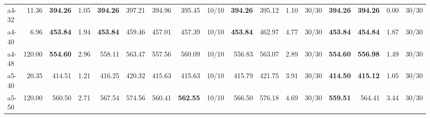 \documentclass[aspectratio=1610]{beamer}
\begin{document}
\begin{frame}[noframenumbering]
\begin{table}[]
{\begin{tabular}{lrrrrrrrrrrrrrrrr}
a4-32                                          & 11.36                                                   & \multicolumn{1}{r|}{\textbf{394.26}} & 1.05                                                         & \textbf{394.26} & \multicolumn{1}{r|}{397.21}                                 & 394.96          & 395.45                                 & \multicolumn{1}{r|}{10/10} & \textbf{394.26} & 395.12                                 & 1.10   & \multicolumn{1}{r|}{30/30} & \textbf{394.26}    & {\color[HTML]{FE0000} \textbf{394.26}}    & 0.00      & 30/30   \\
a4-40                                          & 6.96                                                    & \multicolumn{1}{r|}{\textbf{453.84}} & 1.94                                                         & \textbf{453.84} & \multicolumn{1}{r|}{459.46}                                 & 457.01          & 457.39                                 & \multicolumn{1}{r|}{10/10} & \textbf{453.84} & 462.97                                 & 4.77   & \multicolumn{1}{r|}{30/30} & \textbf{453.84}    & {\color[HTML]{FE0000} \textbf{454.84}}    & 1.87      & 30/30   \\
a4-48                                          & 120.00                                                  & \multicolumn{1}{r|}{\textbf{554.60}} & 2.96                                                         & 558.11          & \multicolumn{1}{r|}{563.47}                                 & 557.56          & 560.09                                 & \multicolumn{1}{r|}{10/10} & 556.83          & 563.07                                 & 2.89   & \multicolumn{1}{r|}{30/30} & \textbf{554.60}    & {\color[HTML]{FE0000} \textbf{556.98}}    & 1.49      & 30/30   \\
a5-40                                          & 20.35                                                   & \multicolumn{1}{r|}{414.51}          & 1.21                                                         & 416.25          & \multicolumn{1}{r|}{420.32}                                 & 415.63          & 415.63                                 & \multicolumn{1}{r|}{10/10} & 415.79          & 421.75                                 & 3.91   & \multicolumn{1}{r|}{30/30} & \textbf{414.50}    & {\color[HTML]{FE0000} \textbf{415.12}}    & 1.05      & 30/30   \\
a5-50                                          & 120.00                                                  & \multicolumn{1}{r|}{560.50}          & 2.71                                                         & 567.54          & \multicolumn{1}{r|}{574.56}                                 & 560.41          & {\color[HTML]{FE0000} \textbf{562.55}} & \multicolumn{1}{r|}{10/10} & 566.50          & 576.18                                 & 4.69   & \multicolumn{1}{r|}{30/30} & \textbf{559.51}    & 564.41                                    & 3.44      & 30/30   \\ \hline

\end{tabular}}
\end{table}
\end{frame}
\end{document}
